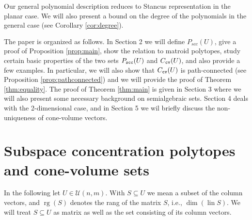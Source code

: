 \documentclass[11pt, a4paper, twoside, reqno]{amsart}
\DeclareMathOperator*{\lin}{lin}
\DeclareMathOperator*{\rg}{rg}
\theoremstyle{definition}
\theoremstyle{remark}
\newcommand{\scc}{{\tt scc}}
\newcommand{\cv}{{\tt cv}}
\numberwithin{equation}{section}
\begin{document}
Our general polynomial description reduces to Stancus representation in the planar case. We will also present a bound on the degree of the polynomials in the general case (see Corollary \ref{cor:degree}).

The paper is organized as follows. In Section 2 we will define $P_{scc}(U)$, give a proof of Proposition \ref{prop:main},  show the relation to matroid polytopes, study certain basic properties of the two sets $P_\scc(U)$ and $C_\cv(U)$, and also provide a few examples. In particular, we will also show that $C_\cv(U)$ is path-connected (see Proposition \ref{prop:pathconnected}) and we will provide the proof of Theorem \ref{thm:equality}.  
The proof of Theorem \ref{thm:main} is given in Section 3 where we will also present some necessary background on semialgebraic sets. Section 4 deals with the 2-dimensional case, and in Section 5 we wil briefly discuss the non-uniqueness of cone-volume vectors.


\section{Subspace concentration polytopes and cone-volume sets}
\label{Section:ConeVolumeSet}

In the following let $U\in\mathcal{U}(n,m)$. With $S\subseteq U$ we mean a
subset of the column vectors, and $\rg(S)$ denotes the rang of the
matrix $S$, i.e., $\dim(\lin S)$. We will treat $S\subseteq U$ as
matrix as well as the set consisting of its  column vectors.
\end{document}
